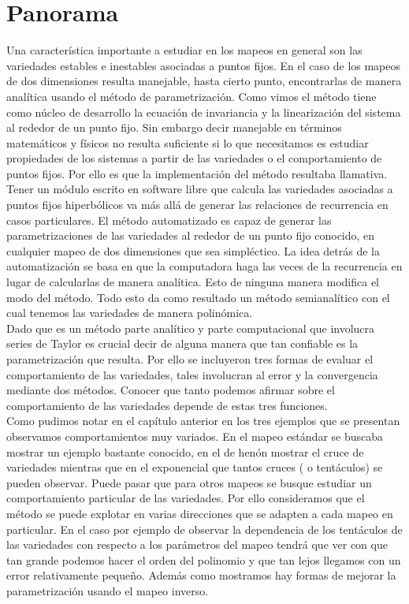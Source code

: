 
\chapter{Panorama}
Una característica importante a estudiar en los mapeos en general son las variedades estables e inestables asociadas a puntos fijos. En el caso de los mapeos de dos dimensiones resulta manejable, hasta cierto punto, encontrarlas de manera analítica usando el método de parametrización. Como vimos el método tiene como núcleo de desarrollo la ecuación de invariancia y la linearización del sistema al rededor de un punto fijo. Sin embargo decir manejable en términos matemáticos y físicos no resulta suficiente si lo que necesitamos es estudiar propiedades de los sistemas a partir de las variedades o el comportamiento de puntos fijos. Por ello es que la implementación del método resultaba llamativa. Tener un módulo escrito en software libre que calcula las variedades asociadas a puntos fijos hiperbólicos va más allá de generar las relaciones de recurrencia en casos particulares. El método automatizado es capaz de generar las parametrizaciones de las variedades al rededor de un punto fijo conocido, en cualquier mapeo de dos dimensiones que sea simpléctico. La idea detrás de la automatización se basa en que la computadora haga las veces de la recurrencia en lugar de calcularlas de manera analítica. Esto de ninguna manera modifica el modo del método. Todo esto da como resultado un método semianalítico con el cual tenemos las variedades de manera polinómica. \\

Dado que es un método parte analítico y parte computacional que involucra series de Taylor es crucial decir de alguna manera que tan confiable es la parametrización que resulta. Por ello se incluyeron tres formas de evaluar el comportamiento de las variedades, tales involucran al error y la convergencia mediante dos métodos. Conocer que tanto podemos afirmar sobre el comportamiento de las variedades depende de estas tres funciones.\\

Como pudimos notar en el capítulo anterior en los tres ejemplos que se presentan observamos comportamientos muy variados. En el mapeo estándar se buscaba mostrar un ejemplo bastante conocido, en el de henón mostrar el cruce de variedades mientras que en el exponencial que tantos cruces ( o tentáculos) se pueden observar. Puede pasar que para otros mapeos se busque estudiar un comportamiento particular de las variedades. Por ello consideramos que el método se puede explotar en varias direcciones que se adapten a cada mapeo en particular. En el caso por ejemplo de observar la dependencia de los tentáculos de las variedades con respecto a los parámetros del mapeo tendrá que ver con que tan grande podemos hacer el orden del polinomio  y que tan lejos llegamos con un error relativamente pequeño. Además como mostramos hay formas de mejorar la parametrización usando el mapeo inverso. \\

